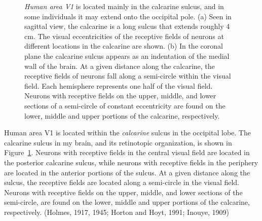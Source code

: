 \begin{figure}
\centerline{
}
\caption[Human area V1:  The calcarine sulcus]{
{\em Human area V1} is located mainly in the calcarine sulcus,
and in some individuals it may extend onto the occipital pole.
(a) Seen in sagittal view, the calcarine
is a long sulcus that extends roughly 4 cm.
The visual eccentricities of the receptive fields of
neurons at different locations in the calcarine are shown.
(b) In the coronal plane the calcarine sulcus appears
as an indentation of the medial wall of the brain.
At a given distance along the calcarine,
the receptive fields of neurons
fall along a semi-circle within the visual field.
Each hemisphere represents one half of the visual field.
Neurons with receptive fields on the
upper, middle, and lower sections of a semi-circle of
constant eccentricity
are found on the lower, middle and upper portions of the calcarine,
respectively.
}
\label{f5:calcarine}
\end{figure}
Human area V1 is located within the {\em calcarine}
sulcus in the occipital lobe.
The calcarine sulcus in my brain,
and its retinotopic organization,
is shown in Figure~\ref{f5:calcarine}.
Neurons with receptive
fields in the central visual field are located in the posterior
calcarine sulcus, while neurons with receptive fields in the periphery are
located in the anterior portions of the sulcus.  
At a given distance along the sulcus, the receptive fields are located
along a semi-circle in the visual field.  Neurons with receptive
fields on the upper, middle, and lower sections of the semi-circle,
are found on the lower, middle and upper portions of the calcarine,
respectively.  (Holmes, 1917, 1945; Horton and Hoyt, 1991;
Inouye, 1909)

